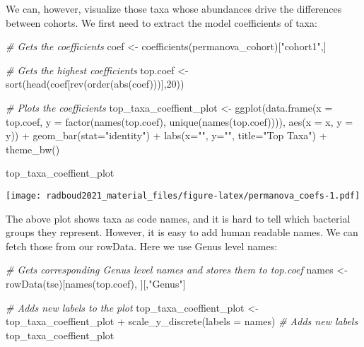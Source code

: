 \documentclass[
]{book}
\newenvironment{Shaded}{\begin{snugshade}}{\end{snugshade}}
\newcommand{\AttributeTok}[1]{\textcolor[rgb]{0.77,0.63,0.00}{#1}}
\newcommand{\CommentTok}[1]{\textcolor[rgb]{0.56,0.35,0.01}{\textit{#1}}}
\newcommand{\DecValTok}[1]{\textcolor[rgb]{0.00,0.00,0.81}{#1}}
\newcommand{\FunctionTok}[1]{\textcolor[rgb]{0.00,0.00,0.00}{#1}}
\newcommand{\NormalTok}[1]{#1}
\newcommand{\OtherTok}[1]{\textcolor[rgb]{0.56,0.35,0.01}{#1}}
\newcommand{\SpecialCharTok}[1]{\textcolor[rgb]{0.00,0.00,0.00}{#1}}
\newcommand{\StringTok}[1]{\textcolor[rgb]{0.31,0.60,0.02}{#1}}
\begin{document}
We can, however, visualize those taxa whose abundances drive the
differences between cohorts. We first need to extract the model
coefficients of taxa:

\begin{Shaded}
\begin{Highlighting}[]
\CommentTok{\# Gets the coefficients}
\NormalTok{coef }\OtherTok{\textless{}{-}} \FunctionTok{coefficients}\NormalTok{(permanova\_cohort)[}\StringTok{"cohort1"}\NormalTok{,]}

\CommentTok{\# Gets the highest coefficients}
\NormalTok{top.coef }\OtherTok{\textless{}{-}} \FunctionTok{sort}\NormalTok{(}\FunctionTok{head}\NormalTok{(coef[}\FunctionTok{rev}\NormalTok{(}\FunctionTok{order}\NormalTok{(}\FunctionTok{abs}\NormalTok{(coef)))],}\DecValTok{20}\NormalTok{))}

\CommentTok{\# Plots the coefficients}
\NormalTok{top\_taxa\_coeffient\_plot }\OtherTok{\textless{}{-}} \FunctionTok{ggplot}\NormalTok{(}\FunctionTok{data.frame}\NormalTok{(}\AttributeTok{x =}\NormalTok{ top.coef,}
                                             \AttributeTok{y =} \FunctionTok{factor}\NormalTok{(}\FunctionTok{names}\NormalTok{(top.coef),}
                         \FunctionTok{unique}\NormalTok{(}\FunctionTok{names}\NormalTok{(top.coef)))),}
                                  \FunctionTok{aes}\NormalTok{(}\AttributeTok{x =}\NormalTok{ x, }\AttributeTok{y =}\NormalTok{ y)) }\SpecialCharTok{+}
  \FunctionTok{geom\_bar}\NormalTok{(}\AttributeTok{stat=}\StringTok{"identity"}\NormalTok{) }\SpecialCharTok{+}
  \FunctionTok{labs}\NormalTok{(}\AttributeTok{x=}\StringTok{""}\NormalTok{, }\AttributeTok{y=}\StringTok{""}\NormalTok{, }\AttributeTok{title=}\StringTok{"Top Taxa"}\NormalTok{) }\SpecialCharTok{+}
  \FunctionTok{theme\_bw}\NormalTok{()}

\NormalTok{top\_taxa\_coeffient\_plot}
\end{Highlighting}
\end{Shaded}

\texttt{[image: radboud2021\_material\_files/figure-latex/permanova\_coefs-1.pdf]}

The above plot shows taxa as code names, and it is hard to tell which
bacterial groups they represent. However, it is easy to add human readable
names. We can fetch those from our rowData. Here we use Genus level names:

\begin{Shaded}
\begin{Highlighting}[]
\CommentTok{\# Gets corresponding Genus level names and stores them to top.coef}
\NormalTok{names }\OtherTok{\textless{}{-}} \FunctionTok{rowData}\NormalTok{(tse)[}\FunctionTok{names}\NormalTok{(top.coef), ][,}\StringTok{"Genus"}\NormalTok{]}

\CommentTok{\# Adds new labels to the plot}
\NormalTok{top\_taxa\_coeffient\_plot }\OtherTok{\textless{}{-}}\NormalTok{ top\_taxa\_coeffient\_plot }\SpecialCharTok{+}
  \FunctionTok{scale\_y\_discrete}\NormalTok{(}\AttributeTok{labels =}\NormalTok{ names) }\CommentTok{\# Adds new labels}
\NormalTok{top\_taxa\_coeffient\_plot}
\end{Highlighting}
\end{Shaded}
\end{document}
